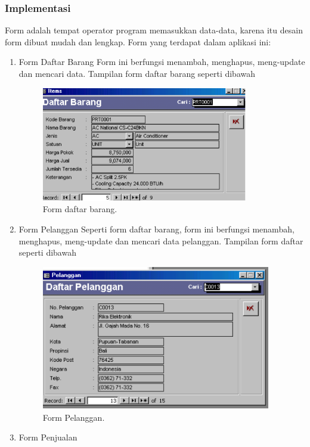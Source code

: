 \documentclass{article}
\begin{document}
\subsubsection{Implementasi}
Form adalah tempat operator program memasukkan data-data, karena itu desain form dibuat mudah dan lengkap. Form yang terdapat dalam aplikasi ini:
\begin{enumerate}
    \item Form Daftar Barang \newline
    Form ini berfungsi menambah, menghapus, meng-update dan mencari data. Tampilan form daftar barang seperti dibawah
    \begin{figure}[htp]
        \centering
        \includegraphics[width=9cm]{gambar_4_4.png}
        \caption{Form daftar barang.}
        \label{fig:44}
    \end{figure}
    \item Form Pelanggan \newline
    Seperti form daftar barang, form ini berfungsi menambah, menghapus, meng-update dan mencari data pelanggan. Tampilan form daftar seperti dibawah
    \begin{figure}[htp]
        \centering
        \includegraphics[width=10cm]{gambar_4_5.png}
        \caption{Form Pelanggan.}
        \label{fig:45}
    \end{figure}
    \item Form Penjualan \newline

\end{enumerate}
\end{document}
